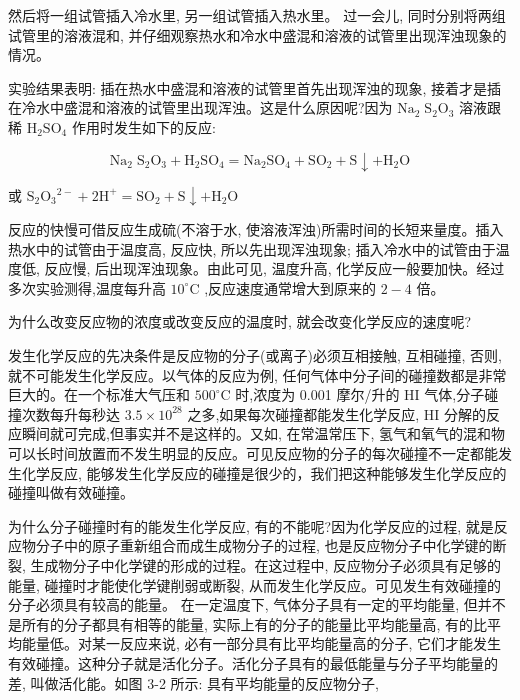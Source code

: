 \documentclass[10pt]{article}
\begin{document}
然后将一组试管插入冷水里, 另一组试管插入热水里。 过一会儿, 同时分别将两组试管里的溶液混和, 并仔细观察热水和冷水中盛混和溶液的试管里出现浑浊现象的情况。

实验结果表明: 插在热水中盛混和溶液的试管里首先出现浑浊的现象, 接着才是插在冷水中盛混和溶液的试管里出现浑浊。这是什么原因呢?因为 \({\mathrm{{Na}}}_{2}{\mathrm{\;S}}_{2}{\mathrm{O}}_{3}\) 溶液跟稀 \({\mathrm{H}}_{2}{\mathrm{{SO}}}_{4}\) 作用时发生如下的反应:

\[
{\mathrm{{Na}}}_{2}{\mathrm{\;S}}_{2}{\mathrm{O}}_{3} + {\mathrm{H}}_{2}{\mathrm{{SO}}}_{4} = {\mathrm{{Na}}}_{2}{\mathrm{{SO}}}_{4} + {\mathrm{{SO}}}_{2} + \mathrm{S} \downarrow + {\mathrm{H}}_{2}\mathrm{O}
\]

或 \({\mathrm{S}}_{2}{\mathrm{O}}_{3}{}^{2 - } + 2{\mathrm{H}}^{ + } = {\mathrm{{SO}}}_{2} + \mathrm{S} \downarrow + {\mathrm{H}}_{2}\mathrm{O}\)

反应的快慢可借反应生成硫(不溶于水, 使溶液浑浊)所需时间的长短来量度。插入热水中的试管由于温度高, 反应快, 所以先出现浑浊现象; 插入冷水中的试管由于温度低, 反应慢, 后出现浑浊现象。由此可见, 温度升高, 化学反应一般要加快。经过多次实验测得,温度每升高 \({10}^{ \circ }\mathrm{C}\) ,反应速度通常增大到原来的 \(2 - 4\) 倍。

为什么改变反应物的浓度或改变反应的温度时, 就会改变化学反应的速度呢?

发生化学反应的先决条件是反应物的分子(或离子)必须互相接触, 互相碰撞, 否则, 就不可能发生化学反应。以气体的反应为例, 任何气体中分子间的碰撞数都是非常巨大的。在一个标准大气压和 \({500}^{ \circ }\mathrm{C}\) 时,浓度为 0.001 摩尔/升的 \(\mathrm{{HI}}\) 气体,分子碰撞次数每升每秒达 \({3.5} \times {10}^{28}\) 之多,如果每次碰撞都能发生化学反应, \(\mathrm{{HI}}\) 分解的反应瞬间就可完成,但事实并不是这样的。又如, 在常温常压下, 氢气和氧气的混和物可以长时间放置而不发生明显的反应。可见反应物的分子的每次碰撞不一定都能发生化学反应, 能够发生化学反应的碰撞是很少的，我们把这种能够发生化学反应的碰撞叫做有效碰撞。

为什么分子碰撞时有的能发生化学反应, 有的不能呢?因为化学反应的过程, 就是反应物分子中的原子重新组合而成生成物分子的过程, 也是反应物分子中化学键的断裂, 生成物分子中化学键的形成的过程。在这过程中, 反应物分子必须具有足够的能量, 碰撞时才能使化学键削弱或断裂, 从而发生化学反应。可见发生有效碰撞的分子必须具有较高的能量。 在一定温度下, 气体分子具有一定的平均能量, 但并不是所有的分子都具有相等的能量, 实际上有的分子的能量比平均能量高, 有的比平均能量低。对某一反应来说, 必有一部分具有比平均能量高的分子, 它们才能发生有效碰撞。这种分子就是活化分子。活化分子具有的最低能量与分子平均能量的差, 叫做活化能。如图 3-2 所示: 具有平均能量的反应物分子,
\end{document}
